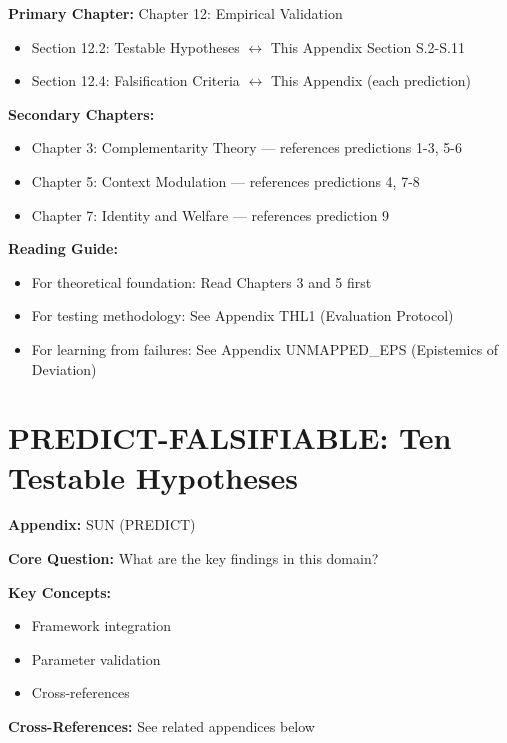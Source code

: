 \begin{tcolorbox}[colback=purple!5!white, colframe=purple!75!black,
    title=Chapter Linkage]

\textbf{Primary Chapter:} Chapter 12: Empirical Validation
\begin{itemize}[nosep]
\item Section 12.2: Testable Hypotheses $\leftrightarrow$ This Appendix Section S.2-S.11
\item Section 12.4: Falsification Criteria $\leftrightarrow$ This Appendix (each prediction)
\end{itemize}

\textbf{Secondary Chapters:}
\begin{itemize}[nosep]
\item Chapter 3: Complementarity Theory --- references predictions 1-3, 5-6
\item Chapter 5: Context Modulation --- references predictions 4, 7-8
\item Chapter 7: Identity and Welfare --- references prediction 9
\end{itemize}

\textbf{Reading Guide:}
\begin{itemize}[nosep]
\item For theoretical foundation: Read Chapters 3 and 5 first
\item For testing methodology: See Appendix THL1 (Evaluation Protocol)
\item For learning from failures: See Appendix UNMAPPED_EPS (Epistemics of Deviation)
\end{itemize}

\end{tcolorbox}


\chapter{PREDICT-FALSIFIABLE: Ten Testable Hypotheses}
\label{app:S-falsifiable}


\begin{tcolorbox}[colback=blue!5!white, colframe=blue!75!black,
    title=Quick Reference: Appendix UNMAPPED_SUN]

\textbf{Appendix:} SUN (PREDICT)

\textbf{Core Question:} What are the key findings in this domain?

\textbf{Key Concepts:}
\begin{itemize}[nosep]
\item Framework integration
\item Parameter validation
\item Cross-references
\end{itemize}

\textbf{Cross-References:} See related appendices below
\end{tcolorbox}

